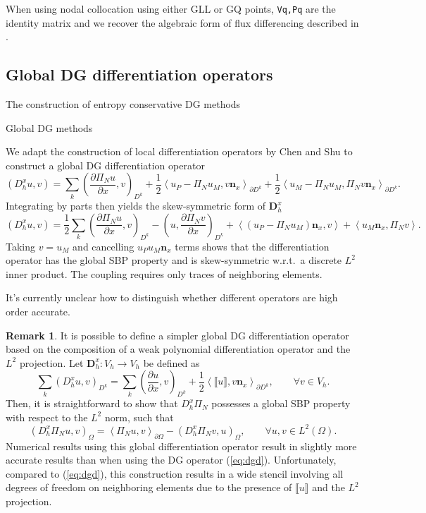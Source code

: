 \documentclass[preprint,10pt]{article}
\theoremstyle{definition}
\theoremstyle{lemma}
\newtheorem*{remark}{Remark}
\theoremstyle{theorem}
\newcommand{\pd}[2]{\frac{\partial#1}{\partial#2}}
\newcommand{\LRp}[1]{\left( #1 \right)}
\newcommand{\LRa}[1]{\left\langle #1 \right\rangle}
\newcommand{\jump}[1] {\ensuremath{\llbracket#1\rrbracket}}
\renewcommand{\L}{L^2\LRp{\Omega}}
\newcommand{\note}[1]{{\color{blue}{#1}}}
\begin{document}
When using nodal collocation using either GLL or GQ points, \verb+Vq,Pq+ are the identity matrix and we recover the algebraic form of flux differencing described in \cite{gassner2016split}.

\note{Introduce definition of $\bm{f}(\bm{u}_q)$ as $f(\bm{u}_q)$.}

\subsection{Global DG differentiation operators}

The construction of entropy conservative DG methods 

Global DG methods \cite{di2011mathematical}

We adapt the construction of local differentiation operators by Chen and Shu \cite{chen2017entropy} to construct a global DG differentiation operator
\begin{equation}
\LRp{D^x_h u,v} = \sum_k \LRp{\pd{ \Pi_N u}{x},v}_{D^k} + \frac{1}{2}{\LRa{{u_P - \Pi_N u_M}, v\bm{n}_x}_{\partial D^k} + \frac{1}{2}\LRa{{u_M - \Pi_Nu_M },\Pi_Nv \bm{n}_x}_{\partial D^k}}.
\label{eq:dgd}
\end{equation}
Integrating by parts then yields the skew-symmetric form of $\bm{D}^x_h$
\[
\LRp{D^x_h u,v} =\frac{1}{2} \sum_k \LRp{\pd{ \Pi_N u}{x},v}_{D^k} - \LRp{u,\pd{\Pi_N v}{x}}_{D^k} + \LRa{\LRp{u_P - \Pi_N u_M}\bm{n}_x, v} + \LRa{{u_M }\bm{n}_x,\Pi_Nv}.
\]
Taking $v = u_M$ and cancelling $u_P u_M \bm{n}_x$ terms shows that the differentiation operator has the global SBP property and is skew-symmetric  w.r.t.\ a discrete $L^2$ inner product.  The coupling requires only traces of neighboring elements.  

It's currently unclear how to distinguish whether different operators are high order accurate.  

\begin{remark}
It is possible to define a simpler global DG differentiation operator based on the composition of a weak polynomial differentiation operator and the $L^2$ projection.  Let $\bm{D}^x_h: V_h\rightarrow V_h$ be defined as
\[
\sum_k \LRp{D^x_h u,v}_{D^k} = \sum_k \LRp{\pd{u}{x},v}_{D^k} + \frac{1}{2}\LRa{\jump{u},v\bm{n}_x}_{\partial D^k}, \qquad \forall v \in V_h.
\]
Then, it is straightforward to show that $D^x_h \Pi_N$ possesses a global SBP property with respect to the $L^2$ norm, such that
\[
\LRp{D^x_h\Pi_N u, v}_{\Omega} = \LRa{\Pi_N u,v}_{\partial \Omega} - \LRp{D^x_h\Pi_N v, u}_{\Omega}, \qquad \forall u,v\in \L.
\]
Numerical results using this global differentiation operator result in slightly more accurate results than when using the DG operator (\ref{eq:dgd}).  Unfortunately, compared to  (\ref{eq:dgd}), this construction results in a wide stencil involving all degrees of freedom on neighboring elements due to the presence of $\jump{u}$ and the $L^2$ projection.  
\end{remark}
\end{document}
